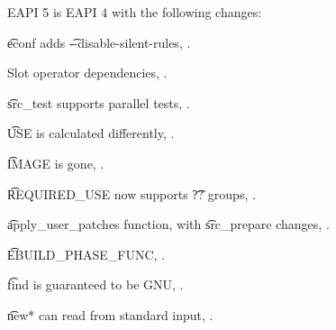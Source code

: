 EAPI 5 is EAPI 4 with the following changes:

\begin{compactitem}
\item \t{econf} adds \t{-{}-disable-silent-rules}, .
\item Slot operator dependencies, .
\item \t{src\_test} supports parallel tests, .
\item \t{USE} is calculated differently, .
\item \t{IMAGE} is gone, .
\item \t{REQUIRED\_USE} now supports \t{??} groups, .
\item \t{apply\_user\_patches} function, with \t{src\_prepare} changes,
    .
\item \t{EBUILD\_PHASE\_FUNC}, .
\item \t{find} is guaranteed to be GNU, .
\item \t{new*} can read from standard input, .
\end{compactitem}



